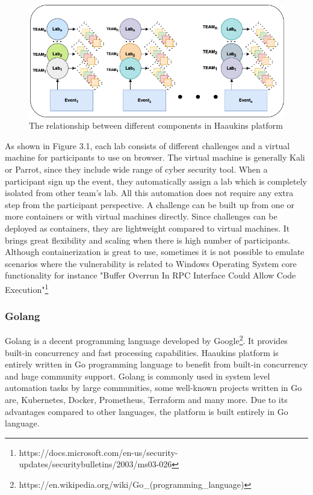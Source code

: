 \begin{figure}[htbp]
\centerline{\includegraphics[scale=.5]{figures/relationship-diagram.png}}
\caption{The relationship between different components in Haaukins platform}
\label{fig}
\end{figure}
 
As shown in Figure 3.1, each lab consists of different challenges and a virtual machine for participants to use on browser\cite{9453985}. The virtual machine is generally Kali or Parrot, since they include wide range of cyber security tool. When a participant sign up the event, they automatically assign a lab which is completely isolated from other team's lab. All this automation does not require any extra step from the participant perspective. A challenge can be built up from one or more containers or with virtual machines directly. Since challenges can be deployed as containers, they are lightweight compared to virtual machines. It brings great flexibility and scaling when there is high number of participants. Although containerization is great to use, sometimes it is not possible to emulate scenarios where the vulnerability is related to Windows Operating System core functionality for instance "Buffer Overrun In RPC Interface Could Allow Code Execution"\footnote{https://docs.microsoft.com/en-us/security-updates/securitybulletins/2003/ms03-026}


\subsubsection{Golang}

Golang is a decent programming language developed by Google\footnote{https://en.wikipedia.org/wiki/Go_(programming_language)}. It provides built-in concurrency and fast processing capabilities. Haaukins platform is entirely written in Go programming language to benefit from built-in concurrency and huge community support. 
Golang is commonly used in system level automation tasks by large communities, some well-known projects written in Go are, Kubernetes, Docker, Prometheus, Terraform and many more. 
Due to its advantages compared to other languages, the platform is built entirely in Go language. 

